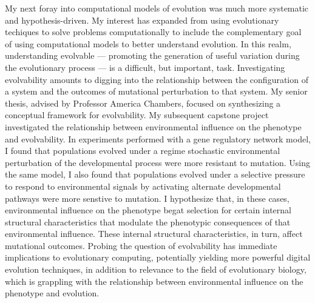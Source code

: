 My next foray into computational models of evolution was much more systematic and hypothesis-driven.
My interest has expanded from using evolutionary techiques to solve problems computationally to include the complementary goal of using computational models to better understand evolution.
In this realm, understanding evolvable  ---  promoting the generation of useful variation during the evolutionary process  ---  is a difficult, but important, task.
Investigating evolvability amounts to digging into the relationship between the configuration of a system and the outcomes of mutational perturbation to that system.
My senior thesis, advised by Professor America Chambers, focused on synthesizing a conceptual framework for evolvability.
My subsequent capstone project investigated the relationship between environmental influence on the phenotype and evolvability.
In experiments performed with a gene regulatory network model, I found that populations evolved under a regime stochastic environmental perturbation of the developmental process were more resistant to mutation.
Using the same model, I also found that populations evolved under a selective pressure to respond to environmental signals by activating alternate developmental pathways were more senstive to mutation.
I hypothesize that, in these cases, environmental influence on the phenotype begat selection for certain internal structural characteristics that modulate the phenotypic consequences of that environmental influence.
These internal structural characteristics, in turn, affect mutational outcomes.
Probing the question of evolvability has immediate implications to evolutionary computing, potentially yielding more powerful digital evolution techniques, in addition to relevance to the field of evolutionary biology, which is grappling with the relationship between environmental influence on the phenotype and evolution.
